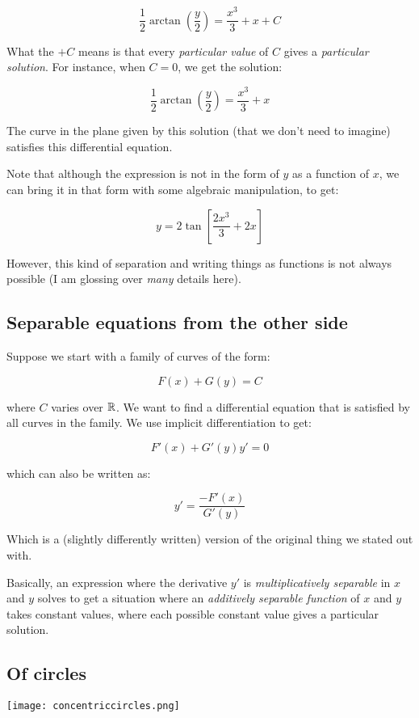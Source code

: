 \documentclass{amsart}
\begin{document}
$$\frac{1}{2} \arctan\left(\frac{y}{2}\right) = \frac{x^3}{3} + x + C$$

What the $+C$ means is that every {\em particular value} of $C$ gives
a {\em particular solution}. For instance, when $C = 0$, we get the
solution:

$$\frac{1}{2} \arctan\left(\frac{y}{2}\right) = \frac{x^3}{3} + x$$

The curve in the plane given by this solution (that we don't need to
imagine) satisfies this differential equation.

Note that although the expression is not in the form of $y$ as a
function of $x$, we can bring it in that form with some algebraic
manipulation, to get:

$$y = 2 \tan\left[\frac{2x^3}{3} + 2x \right]$$

However, this kind of separation and writing things as functions is
not always possible (I am glossing over {\em many} details here).

\subsection{Separable equations from the other side}

Suppose we start with a family of curves of the form:

$$F(x) + G(y) = C$$

where $C$ varies over $\mathbb{R}$. We want to find a differential equation
that is satisfied by all curves in the family. We use implicit
differentiation to get:

$$F'(x) + G'(y) y' = 0$$

which can also be written as:

$$y' = \frac{-F'(x)}{G'(y)}$$

Which is a (slightly differently written) version of the original
thing we stated out with.

Basically, an expression where the derivative $y'$ is {\em
multiplicatively separable} in $x$ and $y$ solves to get a situation
where an {\em additively separable function} of $x$ and $y$ takes
constant values, where each possible constant value gives a particular
solution.

\subsection{Of circles}

\texttt{[image: concentriccircles.png]}
\end{document}
